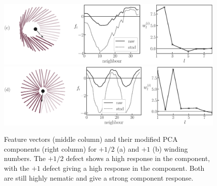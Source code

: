 \begin{figure}[!t]
\centering
\begin{minipage}[c]{\columnwidth}
	\centering
	\includegraphics[width=\columnwidth]{./figs/prob_stats_plushalf_small_0.eps}\\
	\vspace{0.5cm}
	\includegraphics[width=\columnwidth]{./figs/prob_stats_plusone_small_0.eps}
\end{minipage}%
\caption{Feature vectors (middle column) and their modified PCA components (right column) for $+1/2$ (a) and $+1$ (b) winding numbers. The $+1/2$ defect shows a high response in the  component, with the $+1$ defect giving a high response in the  component. Both are still highly nematic and give a strong  component response.
}
\label{FIG:prob_samples2}
\end{figure}



